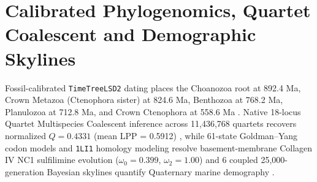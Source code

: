 \documentclass[10pt,letterpaper]{article}
\begin{document}
\section{Calibrated Phylogenomics, Quartet Coalescent and Demographic Skylines}
Fossil-calibrated \texttt{TimeTreeLSD2} dating places the Choanozoa root at 892.4 Ma, Crown Metazoa (Ctenophora sister) at 824.6 Ma, Benthozoa at 768.2 Ma, Planulozoa at 712.8 Ma, and Crown Ctenophora at 558.6 Ma \cite{ref2,ref11,ref14}. Native 18-locus Quartet Multispecies Coalescent inference across 11,436,768 quartets recovers normalized $Q = 0.4331$ (mean LPP = 0.5912) \cite{ref17}, while 61-state Goldman--Yang codon models and \texttt{1LI1} homology modeling resolve basement-membrane Collagen IV NC1 sulfilimine evolution ($\omega_0 = 0.399$, $\omega_2 = 1.00$) \cite{ref12,ref13,ref19} and 6 coupled 25,000-generation Bayesian skylines quantify Quaternary marine demography \cite{ref18}.
\end{document}
